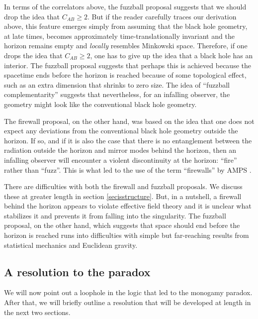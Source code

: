\documentclass[12pt]{article}
\begin{document}
In terms of the correlators above, the fuzzball proposal \cite{Skenderis:2008qn,Mathur:2005zp} suggests that we should drop the idea that $C_{AB} \geq 2$. But if the reader carefully traces our derivation above, this feature emerges simply from assuming
that the black hole geometry, at late times, becomes approximately time-translationally invariant and the horizon remains empty and {\em locally} resembles Minkowski space. Therefore, if one drops the idea that $C_{AB} \geq 2$,
one has to give up the idea that a black hole has an interior. The fuzzball proposal suggests that perhaps this is achieved because the spacetime ends  before the horizon is reached because of some topological effect,
such as an extra dimension that shrinks to zero size. The idea of ``fuzzball complementarity'' \cite{Mathur:2012jk,Avery:2012tf}  suggests that nevertheless, for an infalling observer, the geometry might look like the conventional black hole geometry.


The firewall proposal, on the other hand, was based on the idea that one does not expect any deviations from the conventional black hole geometry outside the horizon. If so, and if it is also the case that there is no entanglement between
the radiation outside the horizon and mirror modes behind the horizon, then an infalling observer will encounter a violent discontinuity at the horizon: ``fire'' rather than ``fuzz''. This is what led to the use of the term ``firewalls'' by AMPS \cite{Almheiri:2012rt}.

There are difficulties with both the firewall and fuzzball proposals. We discuss these at greater length in section \ref{secisstructure}. But, in a nutshell, a  firewall behind the horizon appears to violate effective field theory
and it is unclear what stabilizes it and prevents it from falling into the singularity.  The fuzzball proposal, on the other hand, which suggests that space should end before the horizon is reached runs into difficulties with simple but far-reaching results from statistical mechanics and Euclidean  gravity.






\subsection{A resolution to the paradox \label{resolvemonogamy}}

We will now point out a loophole in the logic that led to the monogamy paradox. After that, we will briefly outline a resolution that will be developed at length in the next two sections.
\end{document}
